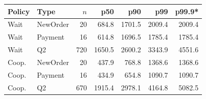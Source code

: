 \begin{tabular}{llrrrrr}
\toprule
Policy & Type & $n$ & p50 & p90 & p99 & p99.9* \\
\midrule
Wait & NewOrder & 20 & 684.8 & 1701.5 & 2009.4 & 2009.4 \\
Wait & Payment & 16 & 614.8 & 1696.5 & 1785.4 & 1785.4 \\
Wait & Q2 & 720 & 1650.5 & 2600.2 & 3343.9 & 4551.6 \\
Coop. & NewOrder & 20 & 437.9 & 768.8 & 1368.6 & 1368.6 \\
Coop. & Payment & 16 & 434.9 & 654.8 & 1090.7 & 1090.7 \\
Coop. & Q2 & 670 & 1915.4 & 2978.1 & 4164.8 & 5082.5 \\
\bottomrule
\end{tabular}

